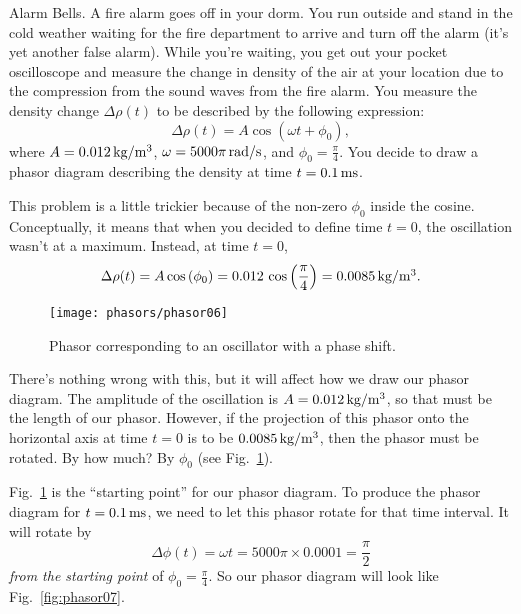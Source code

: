 
\begin{exampleb}{Alarm Bells.} 
\label{example2}
A fire alarm goes off in your dorm. You run outside and stand in the 
cold weather waiting for the fire department to
arrive and turn off the alarm (it's yet another false alarm). While
you're waiting, you get out your pocket oscilloscope and measure the
change in density of the air at your location due to the compression
from the sound waves from the fire alarm. You measure the density
change $\Delta \rho(t)$ to be described by the following expression:
\begin{equation}
\Delta \rho(t) = A\cos{\left(\omega t + \phi_0\right)},
\end{equation} 
where $A = 0.012\,\mbox{kg/m$^3$}$, $\omega =5000\pi\,\mbox{rad/s}$, 
and $\phi_0 = \frac{\pi}{4}$. You decide to draw a phasor diagram 
describing the density at time $t= 0.1\,\mbox{ms}$.
\begin{solution}
This problem is a little trickier because of the non-zero $\phi_0$
inside the cosine. Conceptually, it means that when you decided to
define time $t=0$, the oscillation wasn't at a maximum. Instead, at
time $t=0$,
\begin{equation}
\Delta \rho(t) = A\cos{(\phi_0)} 
                  = 0.012\, \cos{\left(\frac{\pi}{4}\right)}
                  = 0.0085\,\mbox{kg/m$^3$}.
\end{equation}
\begin{figure}[b]
\begin{center}
 \texttt{[image: phasors/phasor06]} 
\caption{\label{fig:phasor06}Phasor corresponding to an oscillator
with a phase shift.}
\end{center}
\end{figure}
There's nothing wrong with this, but it will affect how we draw our
phasor diagram. The amplitude of the oscillation is %
$A = 0.012\,\mbox{kg/m$^3$}$, so that must be the length of our phasor.
However, if the projection of this phasor onto the horizontal axis at
time $t = 0$ is to be $0.0085\,\mbox{kg/m$^3$}$, then the phasor must
be rotated. By how much? By $\phi_0$ (see Fig.~\ref{fig:phasor06}).

Fig.~\ref{fig:phasor06} is the ``starting point'' for our phasor diagram. To
produce the phasor diagram for $t = 0.1\,\mbox{ms}$, we need to let
this phasor rotate for that time interval. It will rotate by
\begin{equation}
\Delta \phi(t) = \omega t = 5000\pi\times 0.0001 = \frac{\pi}{2}
\end{equation} 
{\em from the starting point} of $\phi_0 = \frac{\pi}{4}$.
So our phasor diagram will look like Fig.~\ref{fig:phasor07}. %


\end{solution}
\end{exampleb}
